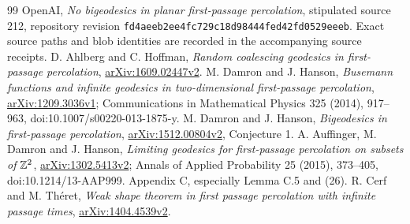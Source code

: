 \begin{thebibliography}{99}
 OpenAI, \emph{No bigeodesics in planar first-passage percolation}, stipulated source 212, repository revision \texttt{fd4aeeb2ee4fc729c18d98444fed42fd0529eeeb}. Exact source paths and blob identities are recorded in the accompanying source receipts.
 D. Ahlberg and C. Hoffman, \emph{Random coalescing geodesics in first-passage percolation}, \href{https://arxiv.org/abs/1609.02447v2}{arXiv:1609.02447v2}.
 M. Damron and J. Hanson, \emph{Busemann functions and infinite geodesics in two-dimensional first-passage percolation}, \href{https://arxiv.org/abs/1209.3036v1}{arXiv:1209.3036v1}; Communications in Mathematical Physics 325 (2014), 917--963, doi:10.1007/s00220-013-1875-y.
 M. Damron and J. Hanson, \emph{Bigeodesics in first-passage percolation}, \href{https://arxiv.org/abs/1512.00804v2}{arXiv:1512.00804v2}, Conjecture 1.
 A. Auffinger, M. Damron and J. Hanson, \emph{Limiting geodesics for first-passage percolation on subsets of $\mathbb Z^2$}, \href{https://arxiv.org/abs/1302.5413v2}{arXiv:1302.5413v2}; Annals of Applied Probability 25 (2015), 373--405, doi:10.1214/13-AAP999. Appendix C, especially Lemma C.5 and (26).
 R. Cerf and M. Th\'eret, \emph{Weak shape theorem in first passage percolation with infinite passage times}, \href{https://arxiv.org/abs/1404.4539v2}{arXiv:1404.4539v2}.
\end{thebibliography}
